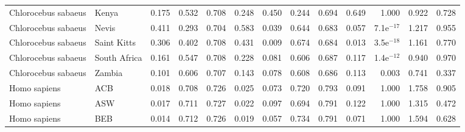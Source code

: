 \begin{longtable}{llrrrrrrrrrrr}
 Chlorocebus sabaeus &                     Kenya &                              0.175 &                               0.532 &                 0.708 &                 0.248 &                              0.450 &                               0.244 &                 0.694 &                 0.649 &        1.000 &  0.922 &  0.728 \\
 Chlorocebus sabaeus &                     Nevis &                              0.411 &                               0.293 &                 0.704 &                 0.583 &                              0.039 &                               0.644 &                 0.683 &                 0.057 & 7.1e$^{-17}$ &  1.217 &  0.955 \\
 Chlorocebus sabaeus &               Saint Kitts &                              0.306 &                               0.402 &                 0.708 &                 0.431 &                              0.009 &                               0.674 &                 0.684 &                 0.013 & 3.5e$^{-18}$ &  1.161 &  0.770 \\
 Chlorocebus sabaeus &              South Africa &                              0.161 &                               0.547 &                 0.708 &                 0.228 &                              0.081 &                               0.606 &                 0.687 &                 0.117 & 1.4e$^{-12}$ &  0.940 &  0.970 \\
 Chlorocebus sabaeus &                    Zambia &                              0.101 &                               0.606 &                 0.707 &                 0.143 &                              0.078 &                               0.608 &                 0.686 &                 0.113 &        0.003 &  0.741 &  0.337 \\
        Homo sapiens &                       ACB &                              0.018 &                               0.708 &                 0.726 &                 0.025 &                              0.073 &                               0.720 &                 0.793 &                 0.091 &        1.000 &  1.758 &  0.905 \\
        Homo sapiens &                       ASW &                              0.017 &                               0.711 &                 0.727 &                 0.022 &                              0.097 &                               0.694 &                 0.791 &                 0.122 &        1.000 &  1.315 &  0.472 \\
        Homo sapiens &                       BEB &                              0.014 &                               0.712 &                 0.726 &                 0.019 &                              0.057 &                               0.734 &                 0.791 &                 0.071 &        1.000 &  1.594 &  0.628 \\

\end{longtable}
